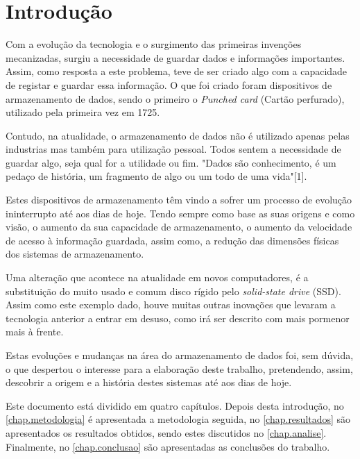 \documentclass{report}
\begin{document}
\clearpage
{}

\chapter{Introdução}
\label{chap.introducao}
	Com a evolução da tecnologia e o surgimento das primeiras invenções mecanizadas, surgiu a necessidade de guardar dados e informações importantes. Assim, como resposta a este problema, teve de ser criado algo com a capacidade de registar e guardar essa informação. O que foi criado foram dispositivos de armazenamento de dados, sendo o primeiro o \textit{Punched card} (Cartão perfurado), utilizado pela primeira vez em 1725. 
\vspace{1mm}
	
	Contudo, na atualidade, o armazenamento de dados não é utilizado apenas pelas industrias mas também para utilização pessoal. Todos sentem a necessidade de guardar algo, seja qual for a utilidade ou fim. "Dados são conhecimento, é um pedaço de história, um fragmento de algo ou um todo de uma vida"[1].
\vspace{1mm}
	
	Estes dispositivos de armazenamento têm vindo a sofrer um processo de evolução ininterrupto até aos dias de hoje. Tendo sempre como base as suas origens e como visão, o aumento da sua capacidade de armazenamento, o aumento da velocidade de acesso à informação guardada, assim como, a redução das dimensões físicas dos sistemas de armazenamento.
\vspace{1mm}
	
	Uma alteração que acontece na atualidade em novos computadores, é a substituição do muito usado e comum disco rígido pelo \textit{solid-state drive} (SSD). Assim como este exemplo dado, houve muitas outras inovações que levaram a tecnologia anterior a entrar em desuso, como irá ser descrito com mais pormenor mais à frente.
\vspace{2mm}

	Estas evoluções e mudanças na área do armazenamento de dados foi, sem dúvida, o que despertou o interesse para a elaboração deste trabalho, pretendendo, assim, descobrir a origem e a história destes sistemas até aos dias de hoje.
\vspace{2mm}



Este documento está dividido em quatro capítulos.
Depois desta introdução,
no \autoref{chap.metodologia} é apresentada a metodologia seguida,
no \autoref{chap.resultados} são apresentados os resultados obtidos,
sendo estes discutidos no \autoref{chap.analise}.
Finalmente, no \autoref{chap.conclusao} são apresentadas
as conclusões do trabalho.
\end{document}
